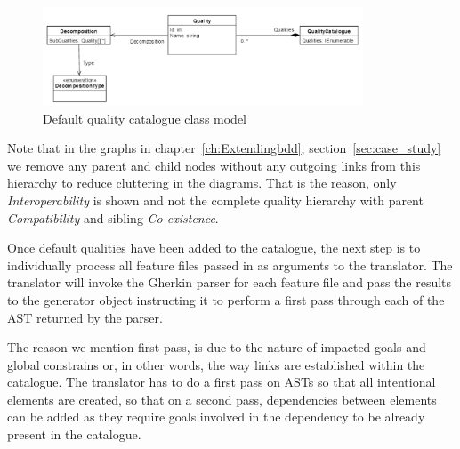 \documentclass[dissertation,final]{softeng}
\begin{document}
\begin{figure}[h!]
\includegraphics[width=0.85\textwidth]{quality_catalogue}
\centering
\caption[Default quality catalogue class model]{Default quality catalogue class model}
\label{fig:quality_catalogue}
\end{figure}

Note that in the graphs in chapter~\ref{ch:Extendingbdd}, section~\ref{sec:case_study} we remove any parent and child nodes without any outgoing links from this hierarchy to reduce cluttering in the diagrams. That is the reason, only \emph{Interoperability} is shown and not the complete quality hierarchy with parent \emph{Compatibility} and sibling \emph{Co-existence}.

Once default qualities have been added to the catalogue, the next step is to individually process all feature files passed in as arguments to the translator. The translator will invoke the Gherkin parser for each feature file and pass the results to the generator object instructing it to perform a first pass through each of the AST returned by the parser.

The reason we mention first pass, is due to the nature of impacted goals and global constrains or, in other words, the way links are established within the catalogue. The translator has to do a first pass on ASTs so that all intentional elements are created, so that on a second pass, dependencies between elements can be added as they require goals involved in the dependency to be already present in the catalogue.
\end{document}
